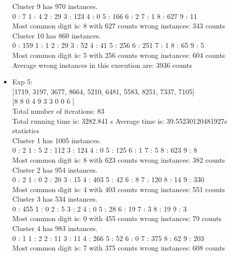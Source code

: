 \documentclass[paper=a4, fontsize=11pt]{scrartcl} %
\numberwithin{equation}{section} %
\numberwithin{figure}{section} %
\numberwithin{table}{section} %
\begin{document}
\begin{itemize}
Cluster 9 has 970 instances.\\
0 : 7   1 : 4   2 : 29  3 : 123 4 : 0   5 : 166 6 : 2   7 : 1   8 : 627 9 : 11\\
Most common digit is: 8 with 627 counts wrong instances: 343 counts\\

Cluster 10 has 860 instances.\\
0 : 159 1 : 1   2 : 29  3 : 52  4 : 41  5 : 256 6 : 251 7 : 1   8 : 65  9 : 5\\
Most common digit is: 5 with 256 counts wrong instances: 604 counts\\

Average wrong instances in this execution are: 3936 counts\\


\item Exp 5: \\

[1719, 3197, 3677, 8664, 5210, 6481, 5583, 8251, 7337, 7105]\\

[8 8 0 4 9 3 3 0 0 6 ]\\

Total number of iterations: 83\\
Total running time is: 3282.841 s Average time is: 39.55230120481927s\\

statistics\\

Cluster 1 has 1005 instances.\\
0 : 2   1 : 5   2 : 112 3 : 124 4 : 0   5 : 125 6 : 1   7 : 5   8 : 623 9 : 8\\
Most common digit is: 8 with 623 counts wrong instances: 382 counts\\

Cluster 2 has 954 instances.\\
0 : 2   1 : 0   2 : 20  3 : 15  4 : 403 5 : 42  6 : 8   7 : 120 8 : 14  9 : 330\\
Most common digit is: 4 with 403 counts wrong instances: 551 counts\\

Cluster 3 has 534 instances.\\
0 : 455 1 : 0   2 : 5   3 : 2   4 : 0   5 : 28  6 : 19  7 : 3   8 : 19  9 : 3\\
Most common digit is: 0 with 455 counts wrong instances: 79 counts\\

Cluster 4 has 983 instances.\\
0 : 1   1 : 2   2 : 11  3 : 11  4 : 266 5 : 52  6 : 0   7 : 375 8 : 62  9 : 203\\
Most common digit is: 7 with 375 counts wrong instances: 608 counts\\


\end{itemize}
\end{document}
